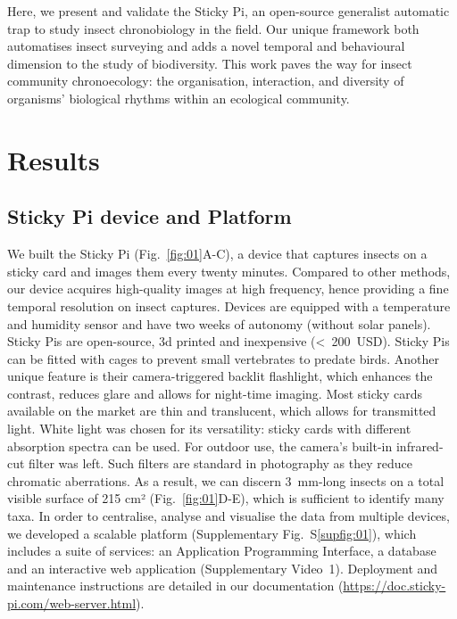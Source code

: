 \documentclass[12pt]{article}
\begin{document}
\begin{linenumbers}
		Here, we present and validate the Sticky Pi, an open-source generalist automatic trap to study insect chronobiology in the field. Our unique framework both automatises insect surveying and adds a novel temporal and behavioural dimension to the study of biodiversity. This work paves the way for insect community chronoecology: the organisation, interaction, and diversity of organisms’ biological rhythms within an ecological community. 
		
		
		
		\section*{Results}
		
		\subsection*{Sticky Pi device and Platform}
		
		We built the Sticky Pi (Fig.~\ref{fig:01}A-C), a device that captures insects on a sticky card and images them every twenty minutes. Compared to other methods, our device acquires high-quality images at high frequency, hence providing a fine temporal resolution on insect captures. Devices are equipped with a temperature and humidity sensor and have two weeks of autonomy (without solar panels). Sticky Pis are open-source, 3d printed and inexpensive (<~200~USD). 
		Sticky Pis can be fitted with cages to prevent small vertebrates to predate birds.
		Another unique feature is their camera-triggered backlit flashlight, which enhances the contrast, reduces glare and allows for night-time imaging. Most sticky cards available on the market are thin and translucent, which allows for transmitted light. 
		White light was chosen for its versatility: sticky cards with different absorption spectra can be used. 
        For outdoor use, the camera's built-in infrared-cut filter was left. 
        Such filters are standard in photography as they reduce chromatic aberrations.
		As a result, we can discern 3~mm-long insects on a total visible surface of 215 cm² (Fig.~\ref{fig:01}D-E), which is sufficient to identify many taxa. In order to centralise, analyse and visualise the data from multiple devices, we developed a scalable platform (Supplementary Fig.~S\ref{supfig:01}), which includes a suite of services: an Application Programming Interface, a database and an interactive web application (Supplementary Video~1). Deployment and maintenance instructions are detailed in our documentation (\href{https://doc.sticky-pi.com/web-server.html}{https://doc.sticky-pi.com/web-server.html}).
		

\end{linenumbers}
\end{document}
